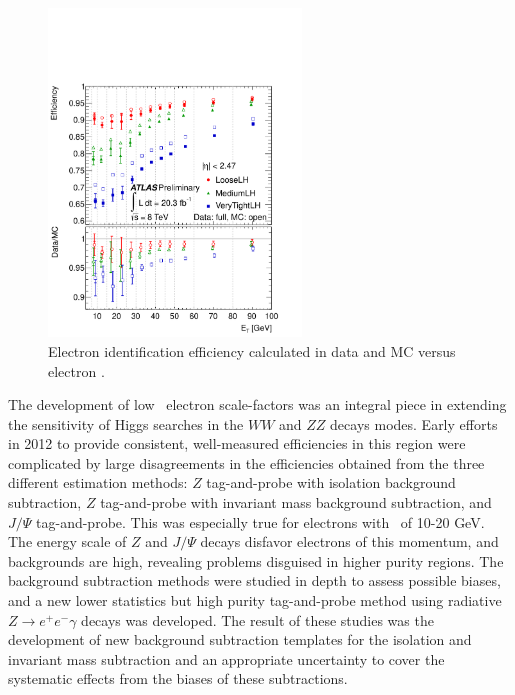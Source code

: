 \begin{figure}[!t]
\centering 
\includegraphics[width=0.60\textwidth]{figs/systematics/fig_22a}
\caption{Electron identification efficiency calculated in data and MC versus electron \pt.} 
\label{figure:electron_eff}
\end{figure}

The development of low \pt\ electron scale-factors was an integral piece in extending the sensitivity of Higgs searches in the $WW$ and $ZZ$ decays modes. Early efforts in 2012 to provide consistent, well-measured efficiencies in this region were complicated by large disagreements in the efficiencies obtained from the three different estimation methods: $Z$ tag-and-probe with isolation background subtraction, $Z$ tag-and-probe with invariant mass background subtraction, and $J/\Psi$ tag-and-probe. This was especially true for electrons with \pt\ of 10-20 GeV. The energy scale of $Z$ and $J/\Psi$ decays disfavor electrons of this momentum, and backgrounds are high, revealing problems disguised in higher purity regions. The background subtraction methods were studied in depth to assess possible biases, and a new lower statistics but high purity tag-and-probe method using radiative $Z\rightarrow e^+e^-\gamma$ decays was developed. The result of these studies was the development of new background subtraction templates for the isolation and invariant mass subtraction and an appropriate uncertainty to cover the systematic effects from the biases of these subtractions.



